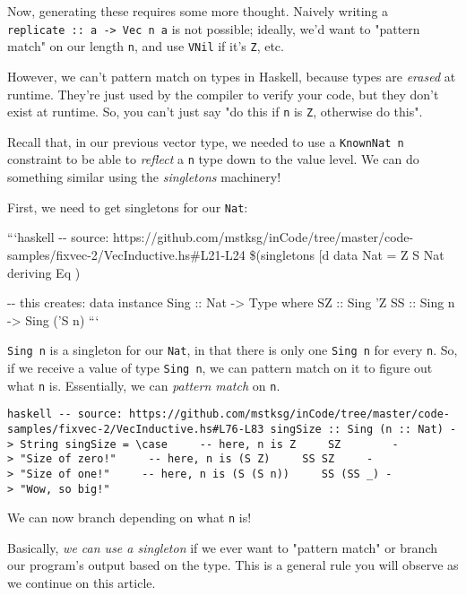 \documentclass[]{article}
\begin{document}
Now, generating these requires some more thought. Naively writing a
\texttt{replicate\ ::\ a\ -\textgreater{}\ Vec\ n\ a} is not possible; ideally,
we'd want to "pattern match" on our length \texttt{n}, and use \texttt{VNil} if
it's \texttt{\textquotesingle{}Z}, etc.

However, we can't pattern match on types in Haskell, because types are
\emph{erased} at runtime. They're just used by the compiler to verify your code,
but they don't exist at runtime. So, you can't just say "do this if \texttt{n}
is \texttt{\textquotesingle{}Z}, otherwise do this".

Recall that, in our previous vector type, we needed to use a
\texttt{KnownNat\ n} constraint to be able to \emph{reflect} a \texttt{n} type
down to the value level. We can do something similar using the \emph{singletons}
machinery!

First, we need to get singletons for our \texttt{Nat}:

```haskell -\/- source:
https://github.com/mstksg/inCode/tree/master/code-samples/fixvec-2/VecInductive.hs\#L21-L24
\$(singletons {[}d\textbar{} data Nat = Z \textbar{} S Nat deriving Eq
\textbar{}{]})

-\/- this creates: data instance Sing :: Nat -\textgreater{} Type where SZ ::
Sing 'Z SS :: Sing n -\textgreater{} Sing ('S n) ```

\texttt{Sing\ n} is a singleton for our \texttt{Nat}, in that there is only one
\texttt{Sing\ n} for every \texttt{n}. So, if we receive a value of type
\texttt{Sing\ n}, we can pattern match on it to figure out what \texttt{n} is.
Essentially, we can \emph{pattern match} on \texttt{n}.

\texttt{haskell\ -\/-\ source:\ https://github.com/mstksg/inCode/tree/master/code-samples/fixvec-2/VecInductive.hs\#L76-L83\ singSize\ ::\ Sing\ (n\ ::\ Nat)\ -\textgreater{}\ String\ singSize\ =\ \textbackslash{}case\ \ \ \ \ -\/-\ here,\ n\ is\ \textquotesingle{}Z\ \ \ \ \ SZ\ \ \ \ \ \ \ \ -\textgreater{}\ "Size\ of\ zero!"\ \ \ \ \ -\/-\ here,\ n\ is\ (\textquotesingle{}S\ \textquotesingle{}Z)\ \ \ \ \ SS\ SZ\ \ \ \ \ -\textgreater{}\ "Size\ of\ one!"\ \ \ \ \ -\/-\ here,\ n\ is\ (\textquotesingle{}S\ (\textquotesingle{}S\ n))\ \ \ \ \ SS\ (SS\ \_)\ -\textgreater{}\ "Wow,\ so\ big!"}

We can now branch depending on what \texttt{n} is!

Basically, \emph{we can use a singleton} if we ever want to "pattern match" or
branch our program's output based on the type. This is a general rule you will
observe as we continue on this article.
\end{document}
